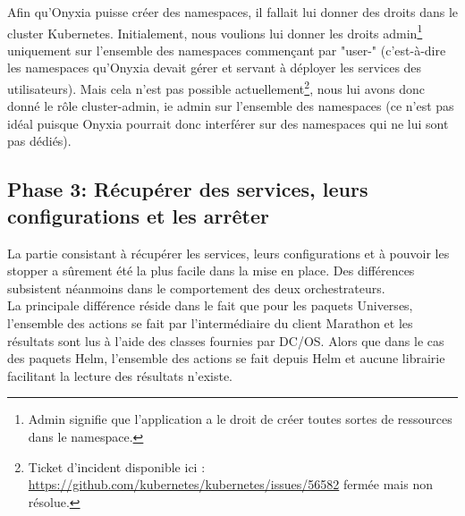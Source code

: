 \documentclass[11pt,fleqn]{book} %
\begin{document}
Afin qu'Onyxia puisse créer des namespaces, il fallait lui donner des droits dans le cluster Kubernetes. Initialement, nous voulions lui donner les droits admin\footnote{Admin signifie que l'application a le droit de créer toutes sortes de ressources dans le namespace.} uniquement sur l'ensemble des namespaces commençant par "user-" (c'est-à-dire les namespaces qu'Onyxia devait gérer et servant à déployer les services des utilisateurs). Mais cela n'est pas possible actuellement\footnote{Ticket d'incident disponible ici : \url{https://github.com/kubernetes/kubernetes/issues/56582} fermée mais non résolue.}, nous lui avons donc donné le rôle cluster-admin, ie admin sur l'ensemble des namespaces (ce n'est pas idéal puisque Onyxia pourrait donc interférer sur des namespaces qui ne lui sont pas dédiés).

\subsection{Phase 3: Récupérer des services, leurs configurations et les arrêter}
La partie consistant à récupérer les services, leurs configurations et à pouvoir les stopper a sûrement été la plus facile dans la mise en place. Des différences subsistent néanmoins dans le comportement des deux orchestrateurs. \\

La principale différence réside dans le fait que pour les paquets Universes, l'ensemble des actions se fait par l'intermédiaire du client Marathon  et les résultats sont lus à l'aide des classes fournies par DC/OS. Alors que dans le cas des paquets Helm, l'ensemble des actions se fait depuis Helm et aucune librairie facilitant la lecture des résultats n'existe.\\
\end{document}
